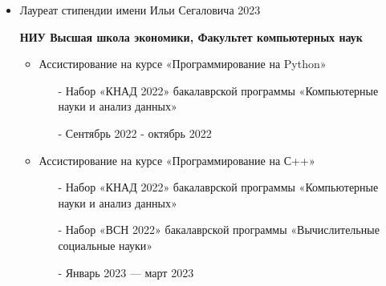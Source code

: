 
\vspace{10pt}


\vspace{10pt}

\begin{itemize}
\item Лауреат стипендии имени Ильи Сегаловича 2023
\end{itemize}

\begin{itemize}
\item[] \textbf{НИУ Высшая школа экономики, Факультет компьютерных наук}
\begin{itemize}
    \item Ассистирование на курсе «Программирование на Python»
    \begin{itemize}
        \item[-] Набор «КНАД 2022» бакалаврской программы «Компьютерные науки и анализ данных»
        \item[-] Сентябрь 2022 - октябрь 2022
    \end{itemize}
    \item Ассистирование на курсе «Программирование на С++»
    \begin{itemize}
        \item[-] Набор «КНАД 2022» бакалаврской программы «Компьютерные науки и анализ данных»
        \item[-] Набор «ВСН 2022» бакалаврской программы «Вычислительные социальные науки»
        \item[-] Январь 2023 --- март 2023
    \end{itemize}
\end{itemize}
\end{itemize}

